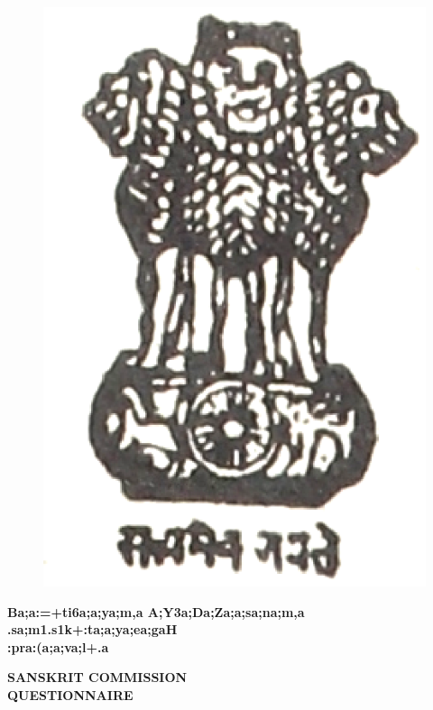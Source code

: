 \newpage

\begin{figure}[h]
\centering
{\includegraphics[scale=.25]{0345.eps}}
\end{figure}

\begin{center}
{\large\bfseries{\sktf Ba;a:=+ti6a;a;ya;m,a A;Y3a;Da;Za;a;sa;na;m,a}}\\[10pt]
{\Large\bfseries{\sktf .sa;m1.s1k+:ta;a;ya;ea;gaH%
}}\\[30pt]
{\Huge\bfseries{\sktf :pra:(a;a;va;l+.a}}
\end{center}


\vskip 3cm

{\rm 
\begin{center}
{\large\bfseries{SANSKRIT COMMISSION}}\\[30pt]
{\large\bfseries{QUESTIONNAIRE}}
\end{center}
}

